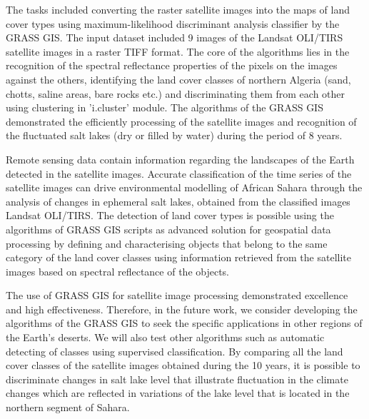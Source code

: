 \documentclass[asi,article,submit,pdftex,moreauthors]{Definitions/mdpi}
\begin{document}
The tasks included converting the raster satellite images into the maps of land cover types using maximum-likelihood discriminant analysis classifier by the GRASS GIS. The input dataset included 9 images of the Landsat OLI/TIRS satellite images in a raster TIFF format. The core of the algorithms lies in the recognition of the spectral reflectance properties of the pixels on the images against the others, identifying the land cover classes of northern Algeria (sand, chotts, saline areas, bare rocks etc.) and discriminating them from each other using clustering in 'i.cluster' module. The algorithms of the GRASS GIS demonstrated the efficiently processing of the satellite images and recognition of the fluctuated salt lakes (dry or filled by water) during the period of 8 years. 

Remote sensing data contain information regarding the landscapes of the Earth detected in the satellite images. Accurate classification of the time series of the satellite images can drive environmental modelling of African Sahara through the analysis of changes in ephemeral salt lakes, obtained from the classified images Landsat OLI/TIRS. The detection of land cover types is possible using the algorithms of GRASS GIS scripts as advanced solution for geospatial data processing by defining and characterising objects that belong to the same category of the land cover classes using information retrieved from the satellite images based on spectral reflectance of the objects. 

The use of GRASS GIS for satellite image processing demonstrated excellence and high effectiveness. Therefore, in the future work, we consider developing the algorithms of the GRASS GIS to seek the specific applications in other regions of the Earth's deserts. We will also test other algorithms such as automatic detecting of classes using supervised classification. By comparing all the land cover classes of the satellite images obtained during the 10 years, it is possible to discriminate changes in salt lake level that illustrate fluctuation in the climate changes which are reflected in variations of the lake level that is located in the northern segment of Sahara. 

\end{document}
